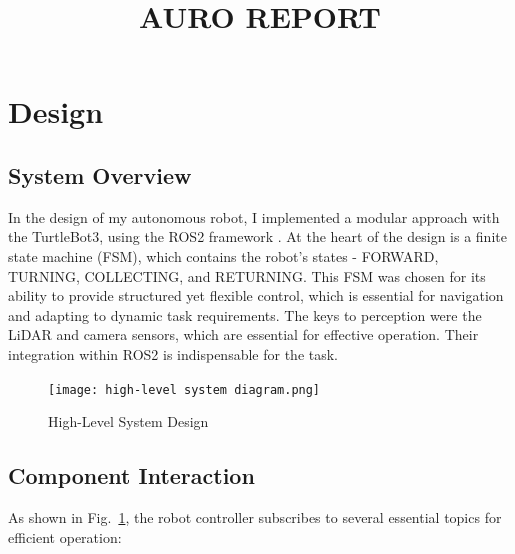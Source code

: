 \documentclass[conference]{IEEEtran}
\begin{document}
\title{AURO REPORT}
\author{}

\maketitle


\section{Design}
\subsection{System Overview}
In the design of my autonomous robot, I implemented a modular approach with the TurtleBot3, using the ROS2 framework \cite{ROS2HumbleHawksbill2024}. At the heart of the design is a finite state machine (FSM), which contains the robot's states - FORWARD, TURNING, COLLECTING, and RETURNING. This FSM was chosen for its ability to provide structured yet flexible control, which is essential for navigation and adapting to dynamic task requirements. The keys to perception were the LiDAR and camera sensors, which are essential for effective operation. Their integration within ROS2 is indispensable for the task.

\begin{figure}[htbp]
\centerline{\texttt{[image: high-level system diagram.png]}}
\caption{High-Level System Design}
\label{fig:systemdesign}
\end{figure}

\subsection{Component Interaction}
As shown in Fig.~\ref{fig:systemdesign}, the robot controller subscribes to several essential topics for efficient operation:
\end{document}
